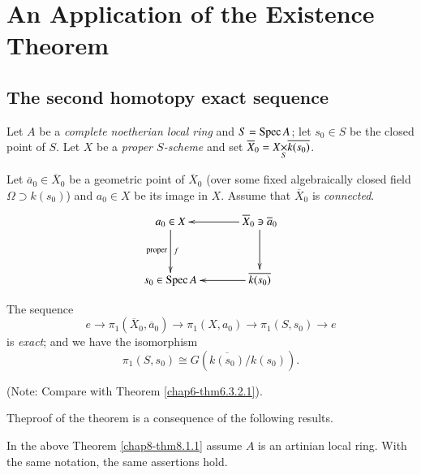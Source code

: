 \chapter{An Application of the Existence Theorem}\label{chap8}

\section{The second homotopy exact
  sequence}\label{chap8-sec8.1}\pageoriginale 

Let $A$ be a {\em complete noetherian local ring} and $S=\operatorname{Spec} A$; let
$s_{0}\in S$ be the closed point of $S$. Let $X$ be a {\em proper
  $S$-scheme} and set
$\overline{X}_{0}=\fprod{X}{\overline{k(s_{0})}}{S}$. 

Let $\overline{a}_{0}\in\overline{X}_{0}$ be a geometric point of
$\overline{X}_{0}$ (over some fixed algebraically closed field
$\Omega\supset k(s_{0})$) and $a_{0}\in X$ be its image in $X$. Assume
that $\overline{X}_{0}$ is {\em connected}.
\[
\xymatrix@=1.2cm{
a_{0}\in X\ar[d]^{f}_{\text{proper}} & \overline{X}_{0}\ni
\overline{a}_{0}\ar[l]\ar[d]\\
s_{0}\in\Spec A & \overline{k(s_{0})}\ar[l]  
}
\]

\begin{theorem}\label{chap8-thm8.1.1}
The sequence
$$
e\to \pi_{1}(\overline{X}_{0},\overline{a}_{0})\to \pi_{1}(X,a_{0})\to
\pi_{1}(S,s_{0})\to e
$$
is {\em exact}; and we have the isomorphism
$$
\pi_{1}(S,s_{0})\cong G(\overline{k(s_{0})}/k(s_{0})).
$$
\end{theorem}

(Note: Compare with Theorem \ref{chap6-thm6.3.2.1}).

The\pageoriginale proof of the theorem is a consequence of the
following results.

\setcounter{prop}{1}
\begin{prop}\label{chap8-prop8.1.2}
In the above Theorem \ref{chap8-thm8.1.1} assume $A$ is an artinian local
ring. With the same notation, the same assertions hold.
\end{prop}


